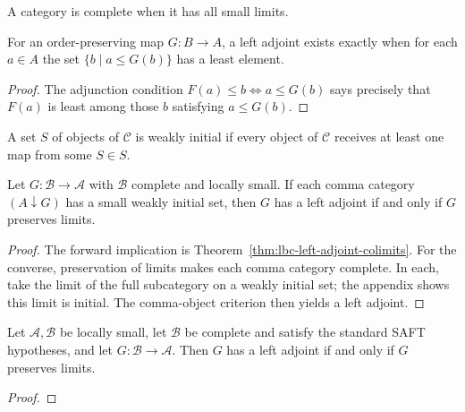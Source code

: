 \begin{definition}
\label{def:lbc-complete}
A category is complete when it has all small limits.
\end{definition}

\begin{proposition}
\label{prop:lbc-ordered-aft}
For an order-preserving map $G:B\to A$, a left adjoint exists exactly when for
each $a\in A$ the set $\{b\mid a\le G(b)\}$ has a least element.
\end{proposition}
\begin{proof}
The adjunction condition $F(a)\le b\iff a\le G(b)$ says precisely that $F(a)$
is least among those $b$ satisfying $a\le G(b)$.
\end{proof}

\begin{definition}
\label{def:lbc-weakly-initial-set}
A set $S$ of objects of $\mathcal C$ is weakly initial if every object of
$\mathcal C$ receives at least one map from some $S\in S$.
\end{definition}

\begin{theorem}
\label{thm:lbc-gaft}
Let $G:\mathcal B\to\mathcal A$ with $\mathcal B$ complete and locally small.
If each comma category $(A\downarrow G)$ has a small weakly initial set, then
$G$ has a left adjoint if and only if $G$ preserves limits.
\end{theorem}
\begin{proof}
The forward implication is Theorem~\ref{thm:lbc-left-adjoint-colimits}. For the
converse, preservation of limits makes each comma category complete. In each,
take the limit of the full subcategory on a weakly initial set; the appendix
shows this limit is initial. The comma-object criterion then yields a left
adjoint.
\end{proof}

\begin{theorem}
\label{thm:lbc-saft}
Let $\mathcal A,\mathcal B$ be locally small, let $\mathcal B$ be complete and
satisfy the standard SAFT hypotheses, and let $G:\mathcal B\to\mathcal A$.
Then $G$ has a left adjoint if and only if $G$ preserves limits.
\notready
\end{theorem}
\begin{proof}
\notready
\end{proof}

